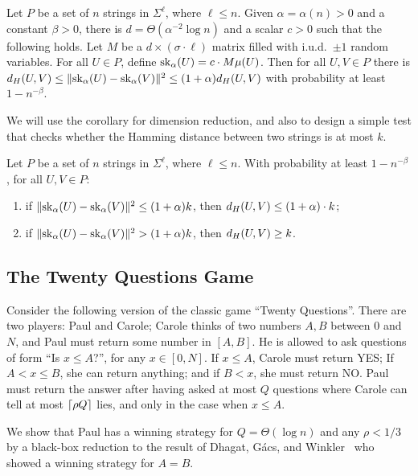 \begin{corollary}\label{cor:dim_reduction}
Let $P$ be a set of $n$ strings in $\Sigma^{\ell}$, where $\ell \le n$. Given $\alpha = \alpha(n) > 0$ and a constant $\beta > 0$, there is $d = \Theta(\alpha^{-2}\log n)$ and a scalar $c > 0$ such that the following holds. Let $M$ be a $d \times (\sigma \cdot \ell)$ matrix filled with i.u.d.\ $\pm1$ random variables. For all $U \in P$, define $\mathrm{sk}_\alpha(U) = c\cdot M \mu(U)$. Then for all $U, V \in P$ there is $d_H(U,V) \leq \lVert\mathrm{sk}_\alpha(U) - \mathrm{sk}_\alpha(V)\rVert^2 \leq (1+\alpha) d_H(U, V)$ with probability at least $1- n^{-\beta}$.
\end{corollary}

We will use the corollary for dimension reduction, and also to design a simple test that checks whether the Hamming distance between two strings is at most $k$. 

\begin{corollary}
Let $P$ be a set of $n$ strings in $\Sigma^{\ell}$, where $\ell \le n$. With probability at least $1- n^{-\beta}$, for all $U, V \in P$:
\begin{enumerate}[label=\arabic*)]
\item if $\lVert\mathrm{sk}_\alpha(U)-\mathrm{sk}_\alpha(V)\rVert^2 \le (1+\alpha) k$, then $d_H(U, V) \le (1+\alpha) \cdot k$;
\item if $\lVert\mathrm{sk}_\alpha(U)-\mathrm{sk}_\alpha(V)\rVert^2 > (1+\alpha) k$, then $d_H(U, V) \ge k$.
\end{enumerate}
\end{corollary}

\subsection{The Twenty Questions Game}
\label{lcs:sec:20questions}
Consider the following version of the classic game ``Twenty Questions''. There are two players: Paul and Carole; Carole thinks of two numbers $A, B$ between $0$ and $N$, and Paul must return some number in $[A,B]$. He is allowed to ask questions of form ``Is $x \le A$?'', for any $x \in [0,N]$. If $x \le A$, Carole must return YES; If $A < x \le B$, she can return anything; and if $B < x$, she must return NO. Paul must return the answer after having asked at most $Q$ questions where Carole can tell at most $\lceil \rho Q \rceil$ lies, and only in the case when $x \le A$.  

We show that Paul has a winning strategy for $Q = \Theta (\log n)$ and any $\rho < 1/3$ by a black-box reduction to the result of Dhagat, G{\'a}cs, and Winkler~\cite{Dhagat:1992:PLQ:139404.139409} who showed a winning strategy for $A = B$.

